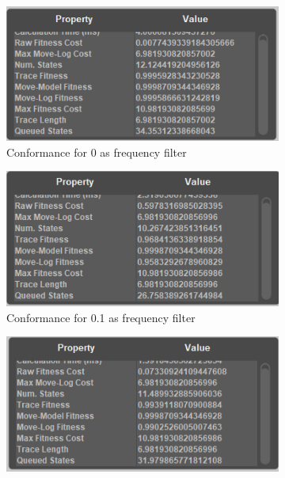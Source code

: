 \begin{figure}[!htbp]
\centering
\begin{subfigure}{.3\textwidth}
  \centering
  \includegraphics[width=\linewidth]{CancConf0.PNG}
  \caption{Conformance for 0 as frequency filter}
  \label{fig:CancCon0}
\end{subfigure}%
\begin{subfigure}{.3\textwidth}
  \centering
  \includegraphics[width=\linewidth]{CancConf0-1.PNG}
  \caption{Conformance for 0.1 as frequency filter}
  \label{fig:CancCon0-1}
\end{subfigure}
\begin{subfigure}{.3\textwidth}
  \centering
  \includegraphics[width=\linewidth]{CancConf0-49.PNG}

\end{subfigure}
\end{figure}
